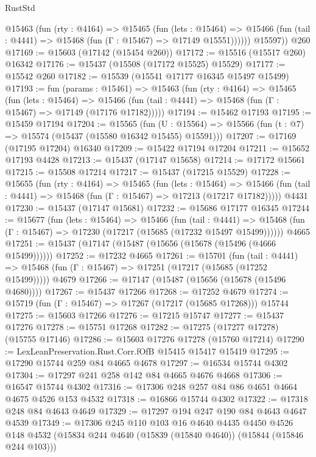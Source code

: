 \begin{lexlean}{RustStd}
\begin{coremodule}
          @15463
            (fun (rty : @4164) =>
            @15465
              (fun (lets : @15464) =>
              @15466 (fun (tail : @4441) => @15468 (fun (Γ : @15467) => @17149 @15551))))))
        @15597))
    @260
@17169 := @15603 (@17142 (@15454 @260))
@17172 := @15516 (@15517 @260) @16342
@17176 := @15437 (@15508 (@17172 @15525) @15529)
@17177 := @15542 @260
@17182 := @15539 (@15541 @17177 @16345 @15497 @15499)
@17193 := fun (params : @15461) =>
  @15463
    (fun (rty : @4164) =>
    @15465
      (fun (lets : @15464) =>
      @15466 (fun (tail : @4441) => @15468 (fun (Γ : @15467) => @17149 (@17176 @17182)))))
@17194 := @15462 @17193
@17195 := @15459 @17194
@17204 := @15565
    (fun (U : @15564) => @15566 (fun (t : @7) => @15574 (@15437 (@15580 @16342 @15455) @15591)))
@17207 := @17169 (@17195 @17204) @16340
@17209 := @15422 @17194 @17204
@17211 := @15652 @17193 @4428
@17213 := @15437 (@17147 @15658)
@17214 := @17172 @15661
@17215 := @15508 @17214
@17217 := @15437 (@17215 @15529)
@17228 := @15655
    (fun (rty : @4164) =>
    @15465
      (fun (lets : @15464) =>
      @15466 (fun (tail : @4441) => @15468 (fun (Γ : @15467) => @17213 (@17217 @17182)))))
    @4431
@17230 := @15437 (@17147 @15681)
@17232 := @15686 @17177 @16345
@17244 := @15677
    (fun (lets : @15464) =>
    @15466
      (fun (tail : @4441) =>
      @15468 (fun (Γ : @15467) => @17230 (@17217 (@15685 (@17232 @15497 @15499))))))
    @4665
@17251 := @15437 (@17147 (@15487 (@15656 (@15678 (@15496 (@4666 @15499))))))
@17252 := @17232 @4665
@17261 := @15701
    (fun (tail : @4441) => @15468 (fun (Γ : @15467) => @17251 (@17217 (@15685 (@17252 @15499)))))
    @4679
@17266 := @17147 (@15487 (@15656 (@15678 (@15496 @4680))))
@17267 := @15437 @17266
@17268 := @17252 @4679
@17274 := @15719 (fun (Γ : @15467) => @17267 (@17217 (@15685 @17268))) @15744
@17275 := @15603 @17266
@17276 := @17215 @15747
@17277 := @15437 @17276
@17278 := @15751 @17268
@17282 := @17275 (@17277 @17278) (@15755 @17146)
@17286 := @15603 @17276 @17278 (@15760 @17214)
@17290 := LexLeanPreservation.Rust.Corr.fOfB @15415 @15417 @15419
@17295 := @17290 @15744 @259 @84 @4665 @4678
@17297 := @16534 @15744 @4302
@17304 := @17297 @241 @258 @142 @84 @4665 @4676 @4668
@17306 := @16547 @15744 @4302
@17316 := @17306 @248 @257 @84 @86 @4651 @4664 @4675 @4526 @153 @4532
@17318 := @16866 @15744 @4302
@17322 := @17318 @248 @84 @4643 @4649
@17329 := @17297 @194 @247 @190 @84 @4643 @4647 @4539
@17349 := @17306
    @245
    @110
    @103
    @16
    @4640
    @4435
    @4450
    @4526
    @148
    @4532
    (@15834 @244 @4640 (@15839 (@15840 @4640)) (@15844 (@15846 @244 @103)))

\end{coremodule}
\end{lexlean}
